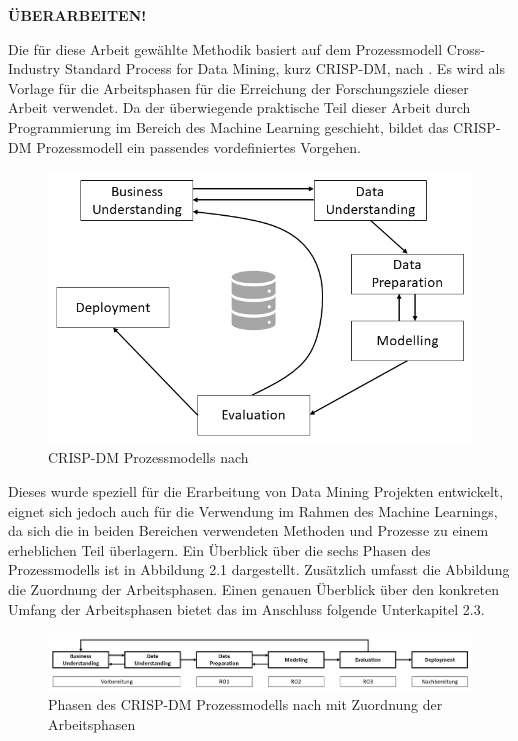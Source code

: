 \textbf{ÜBERARBEITEN!}

Die für diese Arbeit gewählte Methodik basiert auf dem Prozessmodell Cross-Industry Standard Process for Data Mining, kurz CRISP-DM, nach \cite{Chapman2000}. Es wird als Vorlage für die Arbeitsphasen für die Erreichung der Forschungsziele dieser Arbeit verwendet. Da der überwiegende praktische Teil dieser Arbeit durch Programmierung im Bereich des Machine Learning geschieht, bildet das CRISP-DM Prozessmodell ein passendes vordefiniertes Vorgehen. 

\begin{figure}[H]
    \centering
    \includegraphics[width=\textwidth]{images/CRISP-DM1}
    \caption{CRISP-DM Prozessmodells nach \cite{Chapman2000}}\label{fig:crisp1}
\end{figure}

Dieses wurde speziell für die Erarbeitung von Data Mining Projekten entwickelt, eignet sich jedoch auch für die Verwendung im Rahmen des Machine Learnings, da sich die in beiden Bereichen verwendeten Methoden und Prozesse zu einem erheblichen Teil überlagern. Ein Überblick über die sechs Phasen des Prozessmodells ist in Abbildung 2.1 dargestellt. Zusätzlich umfasst die Abbildung die Zuordnung der Arbeitsphasen. Einen genauen Überblick über den konkreten Umfang der Arbeitsphasen bietet das im Anschluss folgende Unterkapitel 2.3.

\begin{figure}[H]
    \centering
    \includegraphics[width=\textwidth]{images/CRISP-DM}
    \caption{Phasen des CRISP-DM Prozessmodells nach \cite{Chapman2000} mit Zuordnung der Arbeitsphasen}\label{fig:crisp}
\end{figure}

